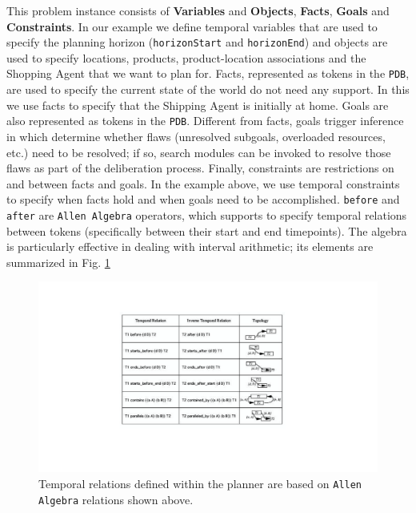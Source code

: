 This problem instance consists of \textbf{Variables} and
\textbf{Objects}, \textbf{Facts}, \textbf{Goals} and
\textbf{Constraints}. In our example we define temporal variables that
are used to specify the planning horizon (\texttt{horizonStart} and
\texttt{horizonEnd}) and objects are used to specify locations,
products, product-location associations and the Shopping Agent that we
want to plan for. Facts, represented as tokens in the \texttt{PDB},
are used to specify the current state of the world  do
not need any support. In this  we use facts to
specify that the Shipping Agent is initially at home. Goals are also
represented as tokens in the \texttt{PDB}. Different from facts, goals
trigger inference in \eu which determine whether flaws (unresolved
subgoals, overloaded resources, etc.) need to be resolved; if so,
search modules can be invoked to resolve those flaws as part of the
deliberation process. Finally, constraints are restrictions on and
between facts and goals. In the example above, we use temporal
constraints to specify when facts hold and when goals need to be
accomplished. \texttt{before} and \texttt{after} are \texttt{Allen
  Algebra} \cite{allen84} operators, which \eu supports to specify
temporal relations between tokens (specifically between their start
and end timepoints). The algebra is particularly effective in dealing
with interval arithmetic; its elements are summarized in
Fig. \ref{fig:allen-algebra}

\begin{figure}[!t]
\centering
\includegraphics[scale=0.4]{figs/Allen-algebra.pdf}
\caption{\small Temporal relations defined within the planner are
  based on \texttt{Allen Algebra} \cite{allen84} relations shown
  above.}
\label{fig:allen-algebra}
\end{figure}


